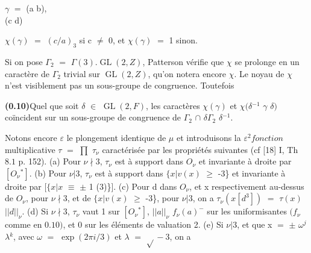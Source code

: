 \documentclass[10pt,a4paper]{article}
\begin{document}
\clearpage
{}
\label{d035-physical-005}
\par\smallskip\begin{center}\begin{minipage}{0.96\textwidth}\centering
$\gamma{}$ $=$ (a b), \\ (c d)
\end{minipage}\end{center}\smallskip
\par\smallskip\begin{center}\begin{minipage}{0.96\textwidth}\centering
$\chi{}(\gamma{})$ $=$ $(c/a)_3$ si c $\ne{}$ 0, et $\chi{}(\gamma{})$ $=$ 1 sinon.
\end{minipage}\end{center}\smallskip
\par Si on pose $\Gamma{}_2$ $=$ $\Gamma{}(3).\operatorname{GL}(2,Z)$, Patterson vérifie que $\chi{}$ se prolonge en un caractère de $\Gamma{}_2$ trivial sur $\operatorname{GL}(2,Z)$, qu'on notera encore $\chi{}$. Le noyau de $\chi{}$ n'est visiblement pas un sous-groupe de congruence. Toutefois\par
\par\noindent\textbf{(0.10)}\quad Quel que soit $\delta{}$ $\in{}$ $\operatorname{GL}(2,F)$, les caractères $\chi{}(\gamma{})$ et $\chi{}(\delta{}^{-1}$ $\gamma{}$ $\delta{})$ coïncident sur un sous-groupe de congruence de $\Gamma{}_2$ $\cap{}$ $\delta{}\Gamma{}_2$ $\delta{}^{-1}$.\par
\par Notons encore $\varepsilon{}$ le plongement identique de $\mu{}$ et introduisons la $\varepsilon{}^2fonction$ multiplicative $\tau{}$ $=$ $\prod{}$ $\tau{}_\nu{}$ caractérisée par les propriétés suivantes (cf [18] I, Th $8.1$ p. 152). (a) Pour $\nu{}\nmid{}3$, $\tau{}_\nu{}$ est à support dans $O_\nu{}$ et invariante à droite par $[O_\nu{}^*]$. (b) Pour $\nu{}|3$, $\tau{}_\nu{}$ est à support dans $\{x|v(x)$ $\ge{}$ -3\} et invariante à droite par $[\{x|x$ $\equiv{}$ $\pm{}$ 1 (3)\}]. (c) Pour d dans $O_\nu{}$, et x respectivement au-dessus de $O_\nu{}$, pour $\nu{}\nmid{}3$, et de $\{x|v(x)$ $\ge{}$ -3\}, pour $\nu{}|3$, on a $\tau{}_\nu{}(x[d^3])$ $=$ $\tau{}(x)$ $||d||_\nu{}$. (d) Si $\nu{}\nmid{}3$, $\tau{}_\nu{}$ vaut 1 sur $[O_\nu{}^*]$, $||a||_\nu{}$ $f_\nu{}(a)^{-}$ sur les uniformisantes $(f_\nu{}$ comme en $0.10)$, et 0 sur les éléments de valuation 2. (e) Si $\nu{}|3$, et que x $=$ $\pm{}$ $\omega{}^j$ $\lambda{}^k$, avec $\omega{}$ $=$ $\exp(2\pi{}i/3)$ et $\lambda{}$ $=$ $\sqrt{}-3$, on a\par
\end{document}
